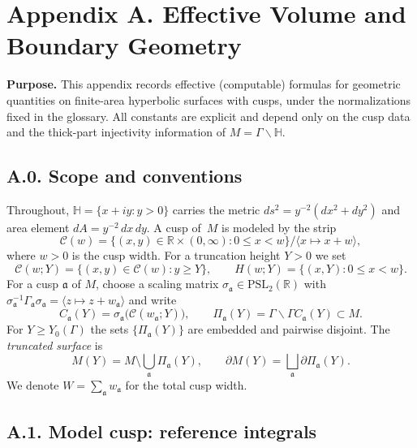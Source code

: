 
\section*{Appendix A. Effective Volume and Boundary Geometry}
\label{appA:sec:effective-geometry}

\noindent\textbf{Purpose.}
This appendix records effective (computable) formulas for geometric quantities on
finite-area hyperbolic surfaces with cusps, under the normalizations fixed in the
glossary. All constants are explicit and depend only on the cusp data and the
thick-part injectivity information of $M=\Gamma\backslash\mathbb{H}$.

\subsection*{A.0. Scope and conventions}
\label{appA:subsec:scope}
Throughout, $\mathbb{H}=\{x+iy:y>0\}$ carries the metric
$ds^2=y^{-2}(dx^2+dy^2)$ and area element $dA=y^{-2}\,dx\,dy$.
A cusp of \,$M$ is modeled by the strip
\[
  \mathcal{C}(w)=\{(x,y)\in\mathbb{R}\times(0,\infty): 0\le x<w\}
/\langle x\mapsto x+w\rangle,
\]
where $w>0$ is the cusp width. For a truncation height $Y>0$ we set
\[
  \mathcal{C}(w;Y)=\{(x,y)\in\mathcal{C}(w): y\ge Y\},
  \qquad
  H(w;Y)=\{(x,Y):0\le x<w\}.
\]
For a cusp $\mathfrak{a}$ of $M$, choose a scaling matrix
$\sigma_{\mathfrak{a}}\in\mathrm{PSL}_2(\mathbb{R})$ with
$\sigma_{\mathfrak{a}}^{-1}\Gamma_{\mathfrak{a}}\sigma_{\mathfrak{a}}
=\langle z\mapsto z+w_{\mathfrak{a}}\rangle$ and write
\[
  C_{\mathfrak{a}}(Y)=\sigma_{\mathfrak{a}}\big(\mathcal{C}(w_{\mathfrak{a}};Y)\big),
  \qquad
  \Pi_{\mathfrak{a}}(Y)=\Gamma\backslash\Gamma C_{\mathfrak{a}}(Y)\subset M.
\]
For $Y\ge Y_0(\Gamma)$ the sets $\{\Pi_{\mathfrak{a}}(Y)\}$ are embedded and
pairwise disjoint. The \emph{truncated surface} is
\[
  M(Y)= M\setminus \bigcup_{\mathfrak{a}} \Pi_{\mathfrak{a}}(Y),
  \qquad
  \partial M(Y)= \bigsqcup_{\mathfrak{a}} \partial\Pi_{\mathfrak{a}}(Y).
\]
We denote $W=\sum_{\mathfrak{a}} w_{\mathfrak{a}}$ for the total cusp width.

\subsection*{A.1. Model cusp: reference integrals}
\label{appA:subsec:model-cusp}

